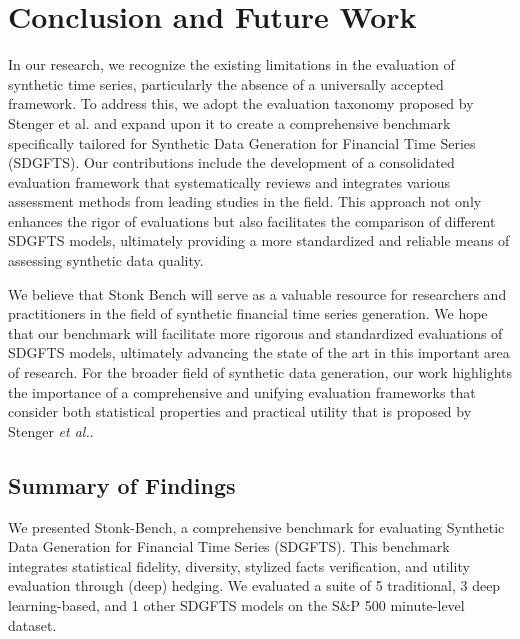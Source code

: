 \section{Conclusion and Future Work}
  In our research, we recognize the existing limitations in the
    evaluation of synthetic time series, particularly the absence of a
    universally accepted framework. To address this, we adopt the
    evaluation taxonomy proposed by Stenger et al. and expand upon it to
    create a comprehensive benchmark specifically tailored for Synthetic
    Data Generation for Financial Time Series (SDGFTS).
    Our contributions include the development of a consolidated evaluation
    framework that systematically reviews and integrates various
    assessment methods from leading studies in the field. This approach
    not only enhances the rigor of evaluations but also facilitates the
    comparison of different SDGFTS models, ultimately providing a more
    standardized and reliable means of assessing synthetic data quality.

  We believe that Stonk Bench will serve as a valuable resource for
    researchers and practitioners in the field of synthetic financial
    time series generation.
    We hope that our benchmark will facilitate more rigorous and
    standardized evaluations of SDGFTS models, ultimately advancing
    the state of the art in this important area of research.
    For the broader field of synthetic data generation, our work
    highlights the importance of a comprehensive and unifying
    evaluation frameworks that consider both statistical properties
    and practical utility that is proposed by Stenger \textit{et al.}.
  \subsection{Summary of Findings}
  We presented Stonk-Bench, a comprehensive benchmark for evaluating 
  Synthetic Data Generation for Financial Time Series (SDGFTS). This 
  benchmark integrates statistical fidelity, diversity, stylized facts 
  verification, and utility evaluation through (deep) hedging. We evaluated 
  a suite of 5 traditional, 3 deep learning-based, and 1 other SDGFTS 
  models on the S\&P 500 minute-level dataset.
